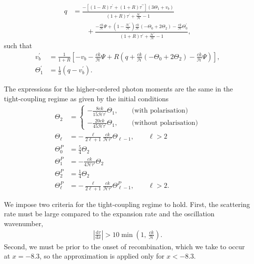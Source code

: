 \documentclass[twocolumn]{aa}
\begin{document}
\begin{align*}
q &= \frac{-[(1-R)\tau^\prime + (1+R)\tau^{\prime\prime}](3\Theta_1+v_b)}{(1+R)\tau^\prime + \frac{\mathcal{H}^\prime}{\mathcal{H}} -1}\\
&\quad\quad+\frac{-\frac{ck}{\mathcal{H}}\Psi + (1-\frac{\mathcal{H}^\prime}{\mathcal{H}})\frac{ck}{\mathcal{H}}(-\Theta_0 +2\Theta_2) - \frac{ck}{\mathcal{H}}\Theta_0^\prime}{(1+R)\tau^\prime + \frac{\mathcal{H}^\prime}{\mathcal{H}} -1},
\end{align*}
such that
\begin{align*}
v_b^\prime &= \frac{1}{1+R} \left[-v_b - \frac{ck}{\mathcal{H}}\Psi + R(q +
\frac{ck}{\mathcal{H}}(-\Theta_0 + 2\Theta_2) - \frac{ck}{\mathcal{H}}\Psi)\right],\\
\Theta^\prime_1 &= \frac{1}{3} (q - v_b^\prime).
\end{align*}

The expressions for the higher-ordered photon moments are the same in the tight-coupling regime as given by the initial conditions
\begin{align*}
\Theta_2 &= \left\{
\begin{array}{l}
-\frac{8ck}{15\mathcal{H}\tau^\prime} \Theta_1, \quad\quad \textrm{(with polarisation)} \\[2mm]
-\frac{20ck}{45\mathcal{H}\tau^\prime} \Theta_1, \quad\quad \textrm{(without polarisation)}
\end{array}\right. \\ 
\Theta_\ell &= -\frac{\ell}{2\ell+1} \frac{ck}{\mathcal{H}\tau'} \Theta_{\ell-1}, \quad\quad \ell > 2\\
\Theta_0^P &= \frac{5}{4}\Theta_2 \\
\Theta_1^P &= -\frac{ck}{4\mathcal{H}\tau'}\Theta_2 \\
\Theta_2^P &= \frac{1}{4}\Theta_2 \\
\Theta_\ell^P &= -\frac{\ell}{2\ell+1} \frac{ck}{\mathcal{H}\tau'} \Theta_{\ell-1}^P, \quad\quad \ell > 2. 
\end{align*}

We impose two criteria for the tight-coupling regime to hold. First, the scattering rate must be large compared to the expansion rate and the oscillation wavenumber,
\begin{align*}
    \left|\frac{\mathrm{d}\tau}{\mathrm{d}x}\right| > 10\min\!\left(1,\,\frac{ck}{\mathcal{H}}\right).
\end{align*}
Second, we must be prior to the onset of recombination, which we take to occur at $x = -8.3$, so the approximation is applied only for $x < -8.3$.
\end{document}
